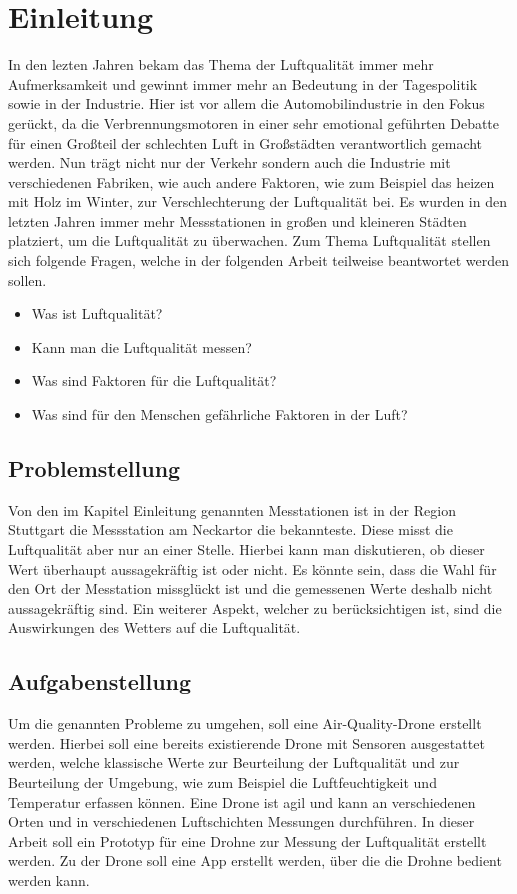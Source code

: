 
\chapter{Einleitung}\label{cha:Einleitung}
In den lezten Jahren bekam das Thema der Luftqualität immer mehr Aufmerksamkeit und gewinnt immer mehr an Bedeutung in der Tagespolitik sowie in der Industrie. Hier ist vor allem die Automobilindustrie in den Fokus gerückt, da die Verbrennungsmotoren in einer sehr emotional geführten Debatte für einen Großteil der schlechten Luft in Großstädten verantwortlich gemacht werden. Nun trägt nicht nur der Verkehr sondern auch die Industrie mit verschiedenen Fabriken, wie auch andere Faktoren, wie zum Beispiel das heizen mit Holz im Winter, zur Verschlechterung der Luftqualität bei. Es wurden in den letzten Jahren immer mehr Messstationen in großen und kleineren Städten platziert, um die Luftqualität zu überwachen.   
\newline
Zum Thema Luftqualität stellen sich folgende Fragen, welche in der folgenden Arbeit teilweise beantwortet werden sollen.
\begin{itemize}
	\item Was ist Luftqualität?
	\item Kann man die Luftqualität messen?
	\item Was sind Faktoren für die Luftqualität?
	\item Was sind für den Menschen gefährliche Faktoren in der Luft?
\end{itemize}	
 
\section{Problemstellung}\label{sec:Problemstellung}
Von den im Kapitel Einleitung genannten Messtationen ist in der Region Stuttgart die Messstation am Neckartor die bekannteste. Diese misst die Luftqualität aber nur an einer Stelle. Hierbei kann man diskutieren, ob dieser Wert überhaupt aussagekräftig ist oder nicht. Es könnte sein, dass die Wahl für den Ort der Messtation missglückt ist und die gemessenen Werte deshalb nicht aussagekräftig sind. 
\newline
Ein weiterer Aspekt, welcher zu berücksichtigen ist, sind die Auswirkungen des Wetters auf die Luftqualität. 

\section{Aufgabenstellung}\label{sec:Aufgabenstellung}
Um die genannten Probleme zu umgehen, soll eine Air-Quality-Drone erstellt werden. Hierbei soll eine bereits existierende Drone mit Sensoren ausgestattet werden, welche klassische Werte zur Beurteilung der Luftqualität und zur Beurteilung der Umgebung, wie zum Beispiel die Luftfeuchtigkeit und Temperatur erfassen können. Eine Drone ist agil und kann an verschiedenen Orten und in verschiedenen Luftschichten Messungen durchführen. 
\newline
In dieser Arbeit soll ein Prototyp für eine Drohne zur Messung der Luftqualität erstellt werden. Zu der Drone soll eine App erstellt werden, über die die Drohne bedient werden kann. 
